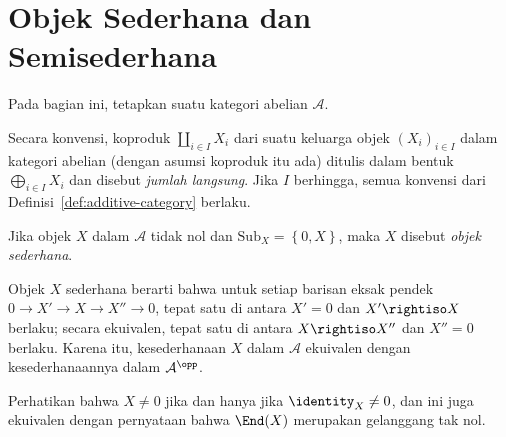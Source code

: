 
\section{Objek Sederhana dan Semisederhana}\label{sec:semisimple}
\hypertarget{o014.aljabr2.chapter2.simplicity-and-semisimplicity}{ }

Pada bagian ini, tetapkan suatu kategori abelian $\mathcal{A}$.

\begin{konvensi}\label{con:direct-sum}
    Secara konvensi, koproduk $\coprod_{i \in I} X_i$ dari suatu keluarga
objek $(X_i)_{i \in I}$ dalam kategori abelian (dengan asumsi koproduk itu ada)
ditulis dalam bentuk $\bigoplus_{i \in I} X_i$ dan disebut
\emph{jumlah langsung}. Jika $I$ berhingga, semua konvensi dari
Definisi~\ref{def:additive-category} berlaku.
\end{konvensi}

\begin{definisi}
    Jika objek $X$ dalam $\mathcal{A}$ tidak nol dan
$\mathrm{Sub}_X = \left\{0, X \right\}$, maka $X$ disebut
\emph{objek sederhana}.
\end{definisi}

Objek $X$ sederhana berarti bahwa untuk setiap barisan eksak pendek
$0 \to X' \to X \to X'' \to 0$, tepat satu di antara $X'=0$ dan
$X'\rightiso X$ berlaku; secara ekuivalen, tepat satu di antara
$X\rightiso X''$ dan $X''=0$ berlaku. Karena itu, kesederhanaan $X$ dalam
$\mathcal{A}$ ekuivalen dengan kesederhanaannya dalam $\mathcal{A}^{\opp}$.

Perhatikan bahwa $X\neq0$ jika dan hanya jika $\identity_X\neq0$, dan ini
juga ekuivalen dengan pernyataan bahwa $\End(X)$ merupakan gelanggang tak nol.

